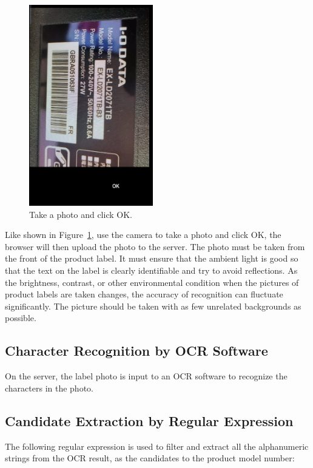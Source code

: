 \documentclass[technicalreport]{ieicej}
\begin{document}
        \begin{figure}[t] 
            \begin{center}
            \includegraphics[width=0.48\textwidth]{figure/camera.png}
            \end{center}
            \caption{Take a photo and click OK.}
            \label{fig:camera}
        \end{figure}

        Like shown in Figure~\ref{fig:camera}, use the camera to take a photo and click OK, the browser will then upload the photo to the server. The photo must be taken from the front of the product label. It must ensure that the ambient light is good so that the text on the label is clearly identifiable and try to avoid reflections. As the brightness, contrast, or other environmental condition when the pictures of product labels are taken changes, the accuracy of recognition can fluctuate significantly. The picture should be taken with as few unrelated backgrounds as possible.

    \subsection{Character Recognition by OCR Software}
        On the server, the label photo is input to an OCR software to recognize the characters in the photo.

    \subsection{Candidate Extraction by Regular Expression}
        The following regular expression is used to filter and extract all the alphanumeric strings from the OCR result, as the candidates to the product model number:
\end{document}

